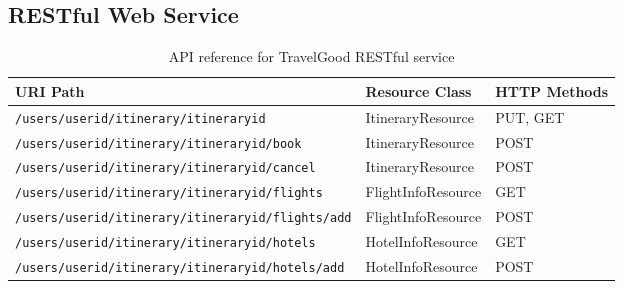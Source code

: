 \subsection{RESTful Web Service}

\begin{table}[H]
\begin{adjustwidth}{-1cm}{-1cm}
\centering
\begin{tabular}{|l|l|l|} \hline
\textbf{URI Path} & \textbf{Resource Class} & \textbf{HTTP Methods} \\ \hline
\texttt{/users/{userid}/itinerary/{itineraryid}} & ItineraryResource & PUT, GET \\ \hline
\texttt{/users/{userid}/itinerary/{itineraryid}/book} & ItineraryResource & POST \\ \hline
\texttt{/users/{userid}/itinerary/{itineraryid}/cancel} & ItineraryResource & POST \\ \hline
\texttt{/users/{userid}/itinerary/{itineraryid}/flights} & FlightInfoResource & GET \\ \hline
\texttt{/users/{userid}/itinerary/{itineraryid}/flights/add} & FlightInfoResource & POST \\ \hline
\texttt{/users/{userid}/itinerary/{itineraryid}/hotels} & HotelInfoResource & GET \\ \hline
\texttt{/users/{userid}/itinerary/{itineraryid}/hotels/add} & HotelInfoResource & POST \\ \hline
\end{tabular}
\caption{API reference for TravelGood RESTful service}
\label{tableAPIref}
\end{adjustwidth}
\end{table}

